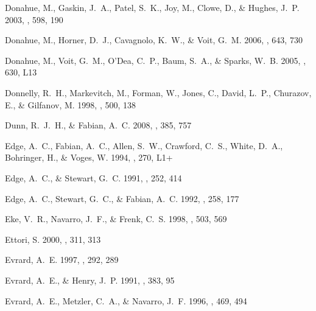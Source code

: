\documentclass[12pt,preprint]{aastex}
\begin{document}
\begin{thebibliography}{139}
{Donahue}, M., {Gaskin}, J.~A., {Patel}, S.~K., {Joy}, M., {Clowe}, D., \&
  {Hughes}, J.~P. 2003, \apj, 598, 190

{Donahue}, M., {Horner}, D.~J., {Cavagnolo}, K.~W., \& {Voit}, G.~M. 2006,
  \apj, 643, 730

{Donahue}, M., {Voit}, G.~M., {O'Dea}, C.~P., {Baum}, S.~A., \& {Sparks}, W.~B.
  2005, \apjl, 630, L13

{Donnelly}, R.~H., {Markevitch}, M., {Forman}, W., {Jones}, C., {David}, L.~P.,
  {Churazov}, E., \& {Gilfanov}, M. 1998, \apj, 500, 138

{Dunn}, R.~J.~H., \& {Fabian}, A.~C. 2008, \mnras, 385, 757

{Edge}, A.~C., {Fabian}, A.~C., {Allen}, S.~W., {Crawford}, C.~S., {White},
  D.~A., {Bohringer}, H., \& {Voges}, W. 1994, \mnras, 270, L1+

{Edge}, A.~C., \& {Stewart}, G.~C. 1991, \mnras, 252, 414

{Edge}, A.~C., {Stewart}, G.~C., \& {Fabian}, A.~C. 1992, \mnras, 258, 177

{Eke}, V.~R., {Navarro}, J.~F., \& {Frenk}, C.~S. 1998, \apj, 503, 569

{Ettori}, S. 2000, \mnras, 311, 313

{Evrard}, A.~E. 1997, \mnras, 292, 289

{Evrard}, A.~E., \& {Henry}, J.~P. 1991, \apj, 383, 95

{Evrard}, A.~E., {Metzler}, C.~A., \& {Navarro}, J.~F. 1996, \apj, 469, 494


\end{thebibliography}
\end{document}
